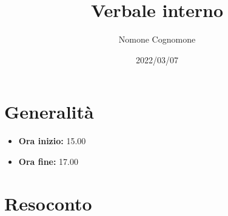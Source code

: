 \documentclass{classes/verbale}
\title{Verbale interno}
\date{2022/03/07}
\author{Nomone Cognomone}
\begin{document}
    \maketitle

    \section{Generalità}
    \begin{itemize}
        \item \textbf{Ora inizio:} 15.00
        \item \textbf{Ora fine:} 17.00
    \end{itemize}

    \section{Resoconto}
    \blindtext
\end{document}
